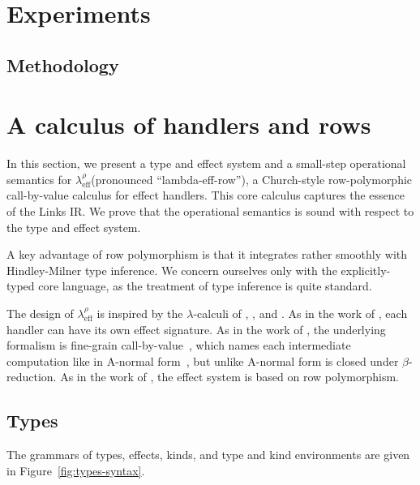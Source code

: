\documentclass[12pt,mscres,cdtppar,twoside,openright,logo,rightchapter,normalheadings]{infthesis}
\theoremstyle{definition}
\newcommand{\Calc}{\ensuremath{\lambda_{\text{eff}}^\rho}\xspace}
\begin{document}
\chapter{Experiments}
\label{ch:experiments}

\section{Methodology}
\label{sec:methodology}

\chapter{A calculus of handlers and rows}
\label{sec:lambe-eff-row}

In this section, we present a type and effect system and a small-step
operational semantics for \Calc (pronounced ``lambda-eff-row''), a
Church-style row-polymorphic call-by-value calculus for effect
handlers.
%
This core calculus captures the essence of the Links IR.
%
We prove that the operational semantics is sound with respect to the
type and effect system.

A key advantage of row polymorphism is that it integrates rather
smoothly with Hindley-Milner type inference. We concern ourselves only
with the explicitly-typed core language, as the treatment of type
inference is quite standard.

The design of \Calc is inspired by the $\lambda$-calculi of
\citet{Kammar2013}, \citet{Pretnar2015}, and \citet{Lindley2012}.
%
As in the work of \citet{Kammar2013}, each handler can have its own
effect signature. As in the work of \citet{Pretnar2015}, the
underlying formalism is fine-grain call-by-value~\cite{LevyPT03},
which names each intermediate computation like in A-normal
form~\cite{Flanagan1993}, but unlike A-normal form is closed under
$\beta$-reduction. As in the work of \citet{Lindley2012}, the effect
system is based on row polymorphism.

\section{Types}
The grammars of types, effects, kinds, and type and kind environments
are given in Figure~\ref{fig:types-syntax}.
\end{document}
